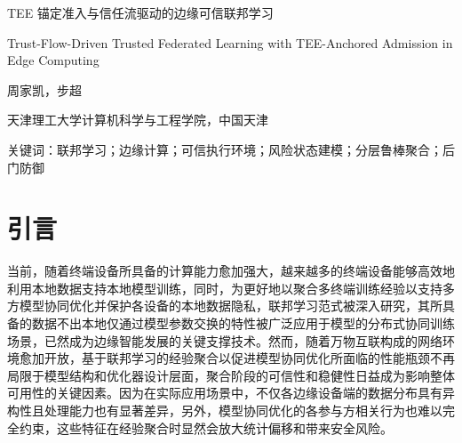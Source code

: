 \documentclass[11pt, a4paper, UTF8, fontset=fandol]{ctexart}
\begin{document}
\begin{center}
    {\Large TEE 锚定准入与信任流驱动的边缘可信联邦学习\par}
    \vspace{4pt}
    {\large Trust-Flow-Driven Trusted Federated Learning with TEE-Anchored Admission in Edge Computing\par}
    \vspace{10pt}
    {周家凯，步超\par}
    \vspace{2pt}
    {天津理工大学计算机科学与工程学院，中国天津\par}
\end{center}

\begin{abstract}
    联邦学习必须同时回答两个问题：更新是否来自可接受的执行流程，以及更新在 Non-IID 数据下是否有用且语义安全。静态 TEE 准入无法回答第二个问题，单一更新质量阈值又可能误除合法长尾客户端。本文提出 Trust Flow 系统级决策框架，在聚合前分离执行可信度、当轮更新内容、长期效用和短期风险。TEE 锚定的可信管理与证明代理（TMAA）提供准入证据；显式 Kalman 递推和双流 Beta/EMA 状态模型处理冷启动与跨轮行为；按层规则执行风险相关裁剪和按数据量的幸存权重重归一化。实验使用两个 Intel/AMD TEE 能力硬件配置、Flower/PyTorch、CIFAR-10、20 个准入客户端、每个平台 5 个种子和 6 类并发攻击。目标 ASR 对触发器、干净标签和语义攻击取宏平均，无目标攻击则通过干净准确率、损失和状态转移评估。在给定协议下，Trust Flow 达到 92.31\% 干净准确率和 10.21\% 目标 ASR，测试运行中没有永久误封。
\end{abstract}

关键词：联邦学习；边缘计算；可信执行环境；风险状态建模；分层鲁棒聚合；后门防御

\section{引言}
当前，随着终端设备所具备的计算能力愈加强大，越来越多的终端设备能够高效地利用本地数据支持本地模型训练，同时，为更好地以聚合多终端训练经验以支持多方模型协同优化并保护各设备的本地数据隐私，联邦学习范式被深入研究\cite{kairouz2021flsurvey}，其所具备的数据不出本地仅通过模型参数交换的特性被广泛应用于模型的分布式协同训练场景，已然成为边缘智能发展的关键支撑技术。然而，随着万物互联构成的网络环境愈加开放，基于联邦学习的经验聚合以促进模型协同优化所面临的性能瓶颈不再局限于模型结构和优化器设计层面，聚合阶段的可信性和稳健性日益成为影响整体可用性的关键因素。因为在实际应用场景中，不仅各边缘设备端的数据分布具有异构性且处理能力也有显著差异，另外，模型协同优化的各参与方相关行为也难以完全约束，这些特征在经验聚合时显然会放大统计偏移和带来安全风险。
\end{document}

